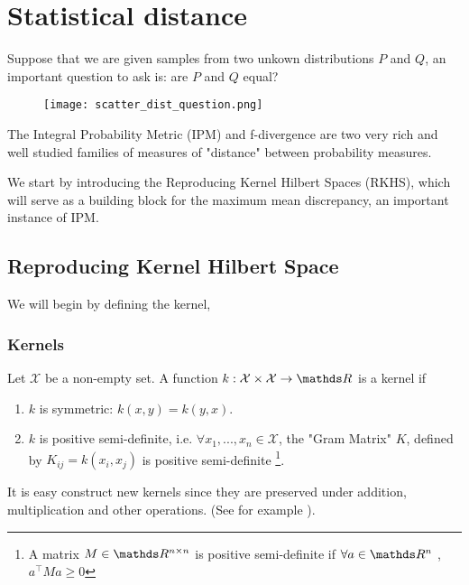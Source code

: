 \chapter{Statistical distance}


Suppose that we are given samples from two unkown distributions $P$ and $Q$, an 
important question to ask is: are $P$ and $Q$ equal?

\begin{figure}[H]
    \centering
    \texttt{[image: scatter\_dist\_question.png]}
    \label{fig:scatter_dist_questions} 
\end{figure}


The Integral Probability Metric (IPM) and f-divergence are two very rich and well studied
families of measures of "distance" between probability measures.

We start by introducing the Reproducing Kernel Hilbert Spaces (RKHS), which will serve as a 
building block for the maximum mean discrepancy, an important instance of IPM.

\section{Reproducing Kernel Hilbert Space}

We will begin by defining the kernel,

\subsection{Kernels}

\begin{definition}
    Let $\mathcal{X}$ be a non-empty set. A function 
    $k: \mathcal{X} \times \mathcal{X} \rightarrow \R$ is a kernel if 
    \begin{enumerate}
        \item $k$ is symmetric: $k(x, y) = k(y, x)$.
        \item $k$ is positive semi-definite, i.e. $\forall x_1, ..., x_n \in \mathcal{X}$,
        the "Gram Matrix" $K$, defined by $K_{ij} = k(x_i, x_j)$ is positive semi-definite
        \footnote{A matrix $M \in \R^{n\times n}$ is positive semi-definite if $\forall a \in \R^n$
        , $a^\intercal Ma \geq 0$}.
    \end{enumerate}
\end{definition}

It is easy construct new kernels since they are preserved under addition, multiplication and other operations. 
(See for example \cite{GrettonNotes}).

